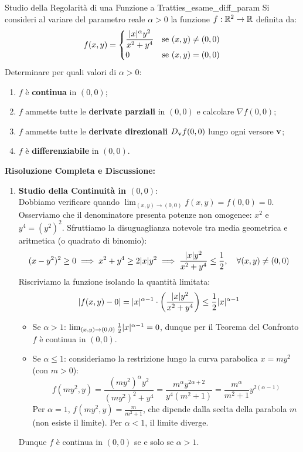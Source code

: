 \begin{esempio}{Studio della Regolarità di una Funzione a Tratti}{es_esame_diff_param}
Si consideri al variare del parametro reale $\alpha > 0$ la funzione $f: \mathbb{R}^2 \to \mathbb{R}$ definita da:
\[
f(x,y) = \begin{cases} \dfrac{\lvert x\rvert^\alpha y^2}{x^2 + y^4} & \text{se } (x,y) \neq (0,0) \\ 0 & \text{se } (x,y) = (0,0) \end{cases}
\]
Determinare per quali valori di $\alpha > 0$:
\begin{enumerate}[label=(\alph*)]
    \item $f$ è \textbf{continua} in $(0,0)$;
    \item $f$ ammette tutte le \textbf{derivate parziali} in $(0,0)$ e calcolare $\nabla f(0,0)$;
    \item $f$ ammette tutte le \textbf{derivate direzionali} $D_{\mathbf{v}} f(0,0)$ lungo ogni versore $\mathbf{v}$;
    \item $f$ è \textbf{differenziabile} in $(0,0)$.
\end{enumerate}

\medskip\noindent\textbf{Risoluzione Completa e Discussione:}
\begin{enumerate}
    \item \textbf{Studio della Continuità in $(0,0)$}:\\
    Dobbiamo verificare quando $\lim_{(x,y) \to (0,0)} f(x,y) = f(0,0) = 0$.
    Osserviamo che il denominatore presenta potenze non omogenee: $x^2$ e $y^4 = (y^2)^2$. Sfruttiamo la disuguaglianza notevole tra media geometrica e aritmetica (o quadrato di binomio):
    \[
    (x - y^2)^2 \ge 0 \implies x^2 + y^4 \ge 2 \lvert x\rvert y^2 \implies \frac{\lvert x\rvert y^2}{x^2 + y^4} \le \frac{1}{2}, \quad \forall (x,y) \neq (0,0)
    \]
    Riscriviamo la funzione isolando la quantità limitata:
    \[
    \lvert f(x,y) - 0\rvert = \lvert x\rvert^{\alpha - 1} \cdot \left( \frac{\lvert x\rvert y^2}{x^2 + y^4} \right) \le \frac{1}{2} \lvert x\rvert^{\alpha - 1}
    \]
    \begin{itemize}
        \item Se $\alpha > 1$: $\lim_{(x,y) \to (0,0)} \frac{1}{2} \lvert x\rvert^{\alpha - 1} = 0$, dunque per il Teorema del Confronto $f$ è continua in $(0,0)$.
        \item Se $\alpha \le 1$: consideriamo la restrizione lungo la curva parabolica $x = m y^2$ (con $m > 0$):
        \[
        f(m y^2, y) = \frac{(m y^2)^\alpha y^2}{(m y^2)^2 + y^4} = \frac{m^\alpha y^{2\alpha + 2}}{y^4 (m^2 + 1)} = \frac{m^\alpha}{m^2 + 1} y^{2(\alpha - 1)}
        \]
        Per $\alpha = 1$, $f(m y^2, y) = \frac{m}{m^2 + 1}$, che dipende dalla scelta della parabola $m$ (non esiste il limite). Per $\alpha < 1$, il limite diverge.
    \end{itemize}
    Dunque $f$ è continua in $(0,0)$ se e solo se $\alpha > 1$.


\end{enumerate}
\end{esempio}
